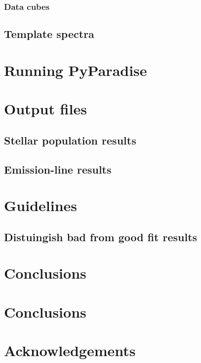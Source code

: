 \documentclass[usenatbib,usegraphicx,useAMS]{mn2e}
\begin{document}
\subsubsection{Data cubes}

\subsection{Template spectra}

\section{Running PyParadise}

\section{Output files}
\subsection{Stellar population results}
\subsection{Emission-line results}

\section{Guidelines}
\subsection{}
\subsection{Distuingish bad from good fit results}

\section{Conclusions}



\section{Conclusions}

\section*{Acknowledgements}


%
%
\end{document}
